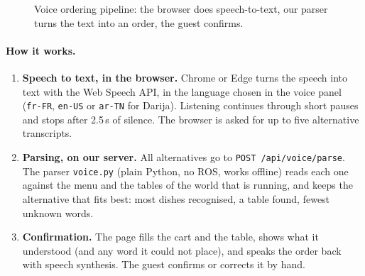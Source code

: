 \documentclass[11pt,a4paper]{article}
\begin{document}
\begin{figure}[H]
\centering
{}
\caption{Voice ordering pipeline: the browser does speech-to-text, our parser turns the text into an order, the guest confirms.}
\end{figure}

\paragraph{How it works.}
\begin{enumerate}
  \item \textbf{Speech to text, in the browser.} Chrome or Edge turns the speech into text with the Web Speech API, in the language chosen in the voice panel (\texttt{fr-FR}, \texttt{en-US} or \texttt{ar-TN} for Darija). Listening continues through short pauses and stops after 2.5\,s of silence. The browser is asked for up to five alternative transcripts.
  \item \textbf{Parsing, on our server.} All alternatives go to \texttt{POST /api/voice/parse}. The parser \texttt{voice.py} (plain Python, no ROS, works offline) reads each one against the menu and the tables of the world that is running, and keeps the alternative that fits best: most dishes recognised, a table found, fewest unknown words.
  \item \textbf{Confirmation.} The page fills the cart and the table, shows what it understood (and any word it could not place), and speaks the order back with speech synthesis. The guest confirms or corrects it by hand.
\end{enumerate}
\end{document}
